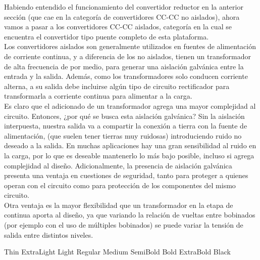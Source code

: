 Habiendo entendido el funcionamiento del convertidor reductor en la anterior sección (que cae en la categoría de convertidores CC-CC no aislados), ahora vamos a pasar a los convertidores CC-CC aislados, categoría en la cual se encuentra el convertidor tipo puente completo de esta plataforma.\\

Los convertidores aislados son generalmente utilizados en fuentes de alimentación de corriente continua, y a diferencia de los no aislados, tienen un transformador de alta frecuencia de por medio, para generar una {\Medium aislación galvánica entre la entrada y la salida}. Además, como los transformadores solo conducen corriente alterna, a su salida debe incluirse algún tipo de circuito rectificador para transformarla a corriente continua para alimentar a la carga.\\

Es claro que el adicionado de un transformador agrega una mayor complejidad al circuito. Entonces, ¿por qué se busca esta aislación galvánica? Sin la aislación interpuesta, nuestra salida va a compartir la conexión a tierra con la fuente de alimentación, (que suelen tener tierras muy ruidosas) introduciendo ruido no deseado a la salida. En muchas aplicaciones hay una gran sensibilidad al ruido en la carga, por lo que es deseable mantenerlo lo más bajo posible, incluso si agrega complejidad al diseño. Adicionalmente, la presencia de aislación galvánica presenta una ventaja en cuestiones de seguridad, tanto para proteger a quienes operan con el circuito como para protección de los componentes del mismo circuito.\\

Otra ventaja es la mayor flexibilidad que un transformador en la etapa de continua aporta al diseño, ya que variando la relación de vueltas entre bobinados (por ejemplo con el uso de múltiples bobinados) se puede variar la tensión de salida entre distintos niveles.\\

\begin{center}
    {\Thin Thin} {\ExtraLight ExtraLight} {\Light Light} Regular {\Medium Medium}  {\SemiBold SemiBold} {\Bold Bold} {\ExtraBold ExtraBold} {\Black Black}
\end{center}